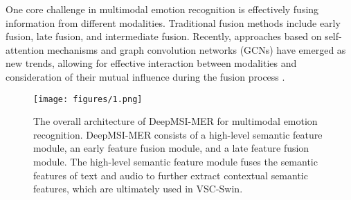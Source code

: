 One core challenge in multimodal emotion recognition is effectively fusing information from different modalities. Traditional fusion methods include early fusion, late fusion, and intermediate fusion. Recently, approaches based on self-attention mechanisms and graph convolution networks (GCNs) have emerged as new trends, allowing for effective interaction between modalities and consideration of their mutual influence during the fusion process \citep{pang2023caver,hu2021mmgcn}.

\begin{figure}[htbp]
	\centering
	\texttt{[image: figures/1.png]}
	\caption{The overall architecture of DeepMSI-MER for multimodal emotion recognition. DeepMSI-MER consists of a high-level semantic feature module, an early feature fusion module, and a late feature fusion module. The high-level semantic feature module fuses the semantic features of text and audio to further extract contextual semantic features, which are ultimately used in VSC-Swin.}
	\label{fig:fig1}
\end{figure}